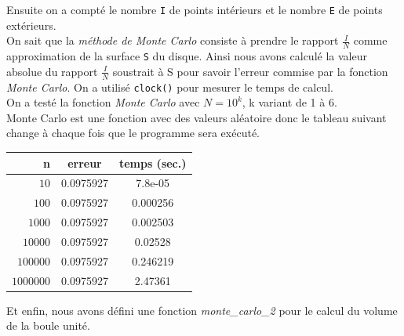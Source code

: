 \documentclass{article}
\begin{document}
Ensuite on a compté le nombre \texttt{I} de points intérieurs et le nombre \texttt{E} de points extérieurs. \\ 

	On sait que la \textit{méthode de Monte Carlo} consiste à prendre le rapport $\frac{I}{N}$ comme approximation de la surface \texttt{S} du disque. Ainsi nous avons calculé la valeur absolue du rapport $\frac{I}{N}$ soustrait à S pour savoir l'erreur commise par la fonction \textit{Monte Carlo}. On a utilisé \texttt{clock()} pour mesurer le temps de calcul.
\\

	On a testé la fonction \textit{Monte Carlo} avec $N=10^k$, k variant de 1 à 6.\\

	Monte Carlo est une fonction avec des valeurs aléatoire donc le tableau suivant change à chaque fois que le programme sera exécuté.\\

\begin{center}
\begin{tabular}{r | c | c}
{n} & erreur & temps (sec.)\\
\hline
$10$ & {0.0975927} & {7.8e-05}\\
$100$ & {0.0975927 } & {0.000256}\\
$1000$ & {0.0975927} & {0.002503}\\
$10000$ & {0.0975927} & {0.02528}\\
$100000$ & {0.0975927} & {0.246219}\\
$1000000$ & {0.0975927} & {2.47361}
\end{tabular}
\end{center}

Et enfin, nous avons défini une fonction \textit{monte\_carlo\_2} pour le calcul du volume de la boule unité.  
\end{document}

